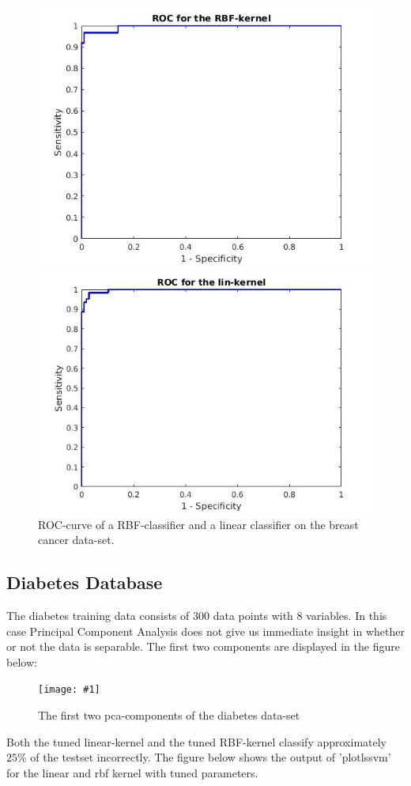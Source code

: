 \documentclass[•]{article}
\newcommand{\apicture}[2] {
  \begin{figure}[H]
  \centering
  \texttt{[image: \#1]}
  \caption{#2}
  \end{figure}
  }
\begin{document}
\begin{figure}[h!]
\centering
\begin{minipage}{.45\textwidth}
\includegraphics[width=.8\textwidth]{rocrbfbreast.jpg}
\end{minipage}
\begin{minipage}{.45\textwidth}
\includegraphics[width=.8\textwidth]{roclinbreast.jpg}
\end{minipage}
\caption{ROC-curve of a RBF-classifier and a linear classifier on the breast cancer data-set.}
\end{figure}

\subsection{Diabetes Database}
The diabetes training data consists of 300 data points with 8 variables. In this case Principal Component Analysis does not give us immediate insight in whether or not the data is separable. The first two components are displayed in the figure below:
\apicture{pcadiabetes.jpg}{The first two pca-components of the diabetes data-set}
Both the tuned linear-kernel and the tuned RBF-kernel classify approximately $25\%$ of the testset incorrectly. The figure below shows the output of 'plotlssvm' for the linear and rbf kernel with tuned parameters. 
\end{document}
